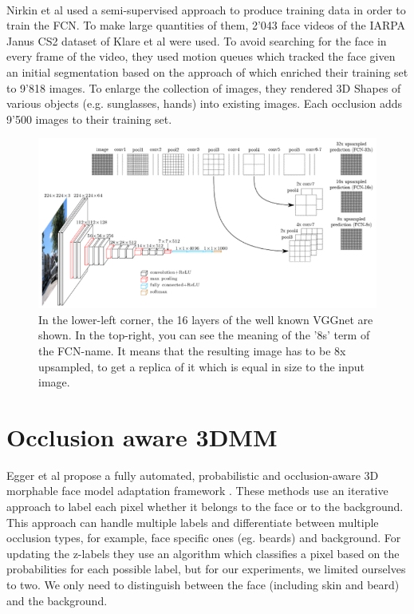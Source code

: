\\
Nirkin et al used a semi-supervised approach to produce training data in order to train the FCN. To make large quantities of them, 2'043 face videos of the IARPA Janus CS2 dataset of Klare et al \cite{IARPAJanus} were used. To avoid searching for the face in every frame of the video, they used motion queues which tracked the face given an initial segmentation based on the approach of \cite{grundmann} which enriched their training set to 9'818 images. To enlarge the collection of images, they rendered 3D Shapes of various objects (e.g. sunglasses, hands) into existing images. Each occlusion adds 9'500 images to their training set.\\

\begin{figure}[H]
	\centering
	\includegraphics[width=1\linewidth]{Figures/fcn_1.png}
	\caption{In the lower-left corner, the 16 layers of the well known VGGnet are shown. In the top-right, you can see the meaning of the '8s' term of the FCN-name. It means that the resulting image has to be 8x upsampled, to get a replica of it which is equal in size to the input image.}
	\label{fig:chap1:VGGnet}
\end{figure}

\section{Occlusion aware 3DMM}

Egger et al propose a fully automated, probabilistic and occlusion-aware 3D morphable face model adaptation framework \cite{egger_paper}. These methods use an iterative approach to label each pixel whether it belongs to the face or to the background. This approach can handle multiple labels and differentiate between multiple occlusion types, for example, face specific ones (eg. beards) and background. For updating the z-labels they use an algorithm which classifies a pixel based on the probabilities for each possible label, but for our experiments, we limited ourselves to two. We only need to distinguish between the face (including skin and beard) and the background.\\

